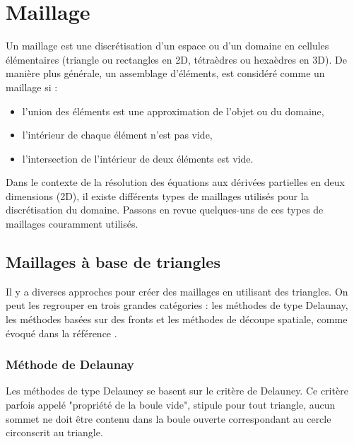 \section{Maillage}

Un maillage est une discrétisation d'un espace ou d'un domaine en cellules élémentaires (triangle ou rectangles en 2D, tétraèdres ou hexaèdres en 3D). De manière plus générale, un assemblage d’éléments, est considéré comme un maillage si \cite{george2013mesh}:\\

\begin{itemize}
\item l’union des éléments est une approximation de l’objet ou du domaine,\\
\item l’intérieur de chaque élément n’est pas vide,\\
\item l’intersection de l’intérieur de deux éléments est vide.\\
\end{itemize}

 Dans le contexte de la résolution des équations aux dérivées partielles en deux dimensions (2D), il existe différents types de maillages utilisés pour la discrétisation du domaine. Passons en revue quelques-uns de ces types de maillages couramment utilisés.

\subsection{Maillages à base de triangles}


Il y a diverses approches pour créer des maillages en utilisant des triangles. On peut les regrouper en trois grandes catégories : les méthodes de type Delaunay, les méthodes basées sur des fronts et les méthodes de découpe spatiale, comme évoqué dans la référence \cite{botella2016generation}.

\subsubsection{Méthode de Delaunay}
Les méthodes de type Delauney se basent sur le critère de Delauney. Ce critère parfois appelé "propriété de la boule vide", stipule pour tout triangle, aucun sommet ne doit être contenu dans la boule ouverte correspondant au cercle circonscrit au triangle.

